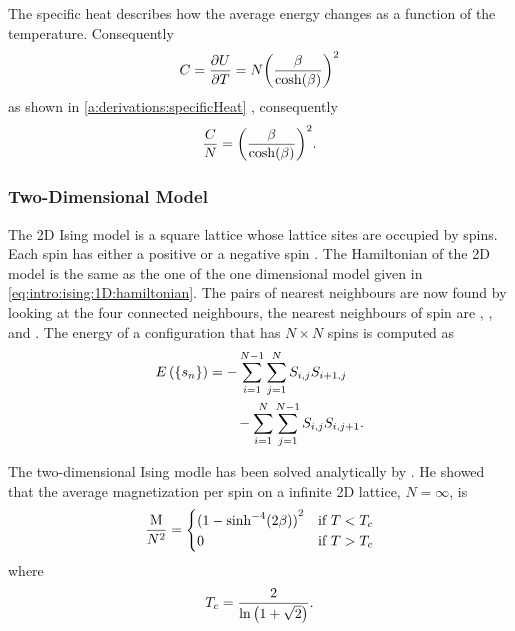 	The specific heat describes how the average energy changes as a function of the temperature. Consequently
	\begin{equation*}
		C = \frac{\partial U}{\partial T} = N {\left(\frac{\beta}{\cosh(\beta)}\right)}^{2}
	\end{equation*}
	as shown in \cref{a:derivations:specificHeat} \cite{warkHandout}, consequently
	\begin{equation*}
	 	\frac{C}{N} = {\left(\frac{\beta}{\cosh(\beta)}\right)}^2.
	 \end{equation*}
 
\subsubsection{Two-Dimensional Model}
	\label{sss:intro:ising:2D}
	The 2D Ising model is a square lattice whose lattice sites are occupied by spins. Each spin has either a positive or a negative spin \cite{kenzel1997physics}. The Hamiltonian of the 2D model is the same as the one of the one dimensional model given in \cref{eq:intro:ising:1D:hamiltonian}. The pairs of nearest neighbours are now found by looking at the four connected neighbours, \ie the nearest neighbours of spin  are , ,  and . The energy of a configuration  that has $N \times N$ spins is computed as
	\begin{equation*}
		\begin{split}
		E\left(\left\{s_{n}\right\} \right) 
			& = - \sum_{i = 1}^{N - 1}\sum_{j = 1}^{N} S_{i,j}S_{i+1,j}\\
			&\quad\quad - \sum_{i = 1}^{N}\sum_{j = 1}^{N - 1} S_{i,j} S_{i, j+1}.
		\end{split}
	\end{equation*}

	The two-dimensional Ising modle has been solved analytically by \textcite{onsager1944crystal}. He showed that the average magnetization per spin on a infinite 2D lattice, \ie $N = \infty$, is
	\begin{equation*}
		\frac{\mathrm{M}}{N^2} = \begin{cases}
			{(1 - {\sinh}^{-4}(2\beta))}^2 & \text{if } T < T_{c}\\
			0 								& \text{if } T > T_{c}
		\end{cases}
	\end{equation*}
	where
	\begin{equation*}
		T_{c} = \frac{2}{\ln \left(1 + \sqrt{2}\right)}.
	\end{equation*}